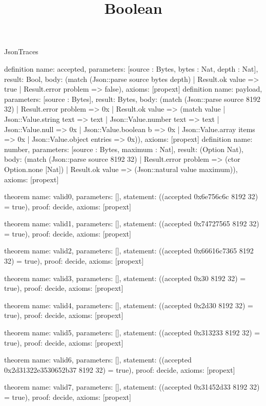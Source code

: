 \begin{lexlean}{JsonTraces}
\title{Boolean}
\begin{semanticmodule}
definition{
  name: accepted,
  parameters: [source : Bytes, bytes : Nat, depth : Nat],
  result: Bool,
  body: (match (Json::parse source bytes depth) | Result.ok value => true | Result.error problem => false),
  axioms: [propext]
}
definition{
  name: payload,
  parameters: [source : Bytes],
  result: Bytes,
  body: (match (Json::parse source 8192 32) | Result.error problem => 0x | Result.ok value => (match value | Json::Value.string text => text | Json::Value.number text => text | Json::Value.null => 0x | Json::Value.boolean b => 0x | Json::Value.array items => 0x | Json::Value.object entries => 0x)),
  axioms: [propext]
}
definition{
  name: number,
  parameters: [source : Bytes, maximum : Nat],
  result: (Option Nat),
  body: (match (Json::parse source 8192 32) | Result.error problem => (ctor Option.none [Nat]) | Result.ok value => (Json::natural value maximum)),
  axioms: [propext]
}

theorem{
  name: valid0,
  parameters: [],
  statement: ((accepted 0x6e756c6c 8192 32) = true),
  proof: decide{},
  axioms: [propext]
}

theorem{
  name: valid1,
  parameters: [],
  statement: ((accepted 0x74727565 8192 32) = true),
  proof: decide{},
  axioms: [propext]
}

theorem{
  name: valid2,
  parameters: [],
  statement: ((accepted 0x66616c7365 8192 32) = true),
  proof: decide{},
  axioms: [propext]
}

theorem{
  name: valid3,
  parameters: [],
  statement: ((accepted 0x30 8192 32) = true),
  proof: decide{},
  axioms: [propext]
}

theorem{
  name: valid4,
  parameters: [],
  statement: ((accepted 0x2d30 8192 32) = true),
  proof: decide{},
  axioms: [propext]
}

theorem{
  name: valid5,
  parameters: [],
  statement: ((accepted 0x313233 8192 32) = true),
  proof: decide{},
  axioms: [propext]
}

theorem{
  name: valid6,
  parameters: [],
  statement: ((accepted 0x2d31322e3530652b37 8192 32) = true),
  proof: decide{},
  axioms: [propext]
}

theorem{
  name: valid7,
  parameters: [],
  statement: ((accepted 0x31452d33 8192 32) = true),
  proof: decide{},
  axioms: [propext]
}


\end{semanticmodule}
\end{lexlean}
